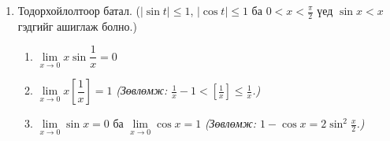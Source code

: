 \begin{enumerate}
\item Тодорхойлолтоор батал. ($|\sin t|\le1$, $|\cos t|\le1$ ба $0<x<\frac\pi2$ үед $\sin x<x$ гэдгийг ашиглаж болно.)
  \begin{enumerate}[label=\roman*)]
  \item $\lim\limits_{x\to0}x\sin\dfrac1x=0$
  \item $\lim\limits_{x\to0}x\left[\dfrac1x\right]=1$ \quad \textit{(Зөвлөмж: $\frac1x-1<\left[\frac1x\right]\le\frac1x$.)}
  \item $\lim\limits_{x\to0}\sin x=0$ ба $\lim\limits_{x\to0}\cos x=1$ \quad \textit{(Зөвлөмж: $1-\cos x=2\sin^2\frac x2$.)}
  \end{enumerate}
\end{enumerate}